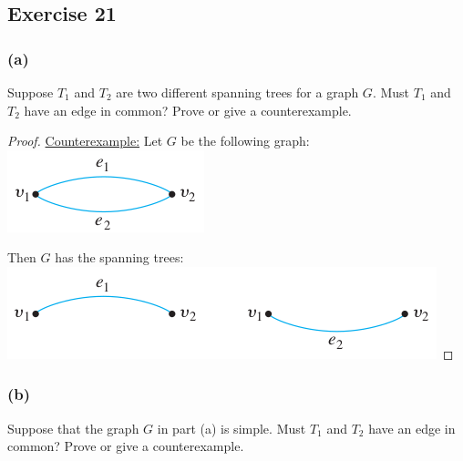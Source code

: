 \documentclass[14pt]{extarticle}
\begin{document}
\subsection{Exercise 21}
\subsubsection{(a)}
Suppose \(T_1\) and \(T_2\) are two different spanning trees for a graph \(G\). Must \(T_1\) and \(T_2\) have an edge in 
common? Prove or give a counterexample.

\begin{proof}
\underline{Counterexample:} Let \(G\) be the following graph:
\includegraphics[scale=0.5]{../images/10.6.21.a.1.png}

Then \(G\) has the spanning trees:
\includegraphics[scale=0.5]{../images/10.6.21.a.2.png}
\end{proof}

\subsubsection{(b)}
Suppose that the graph \(G\) in part (a) is simple. Must \(T_1\) and \(T_2\) have an edge in common? Prove or give a 
counterexample.
\end{document}

